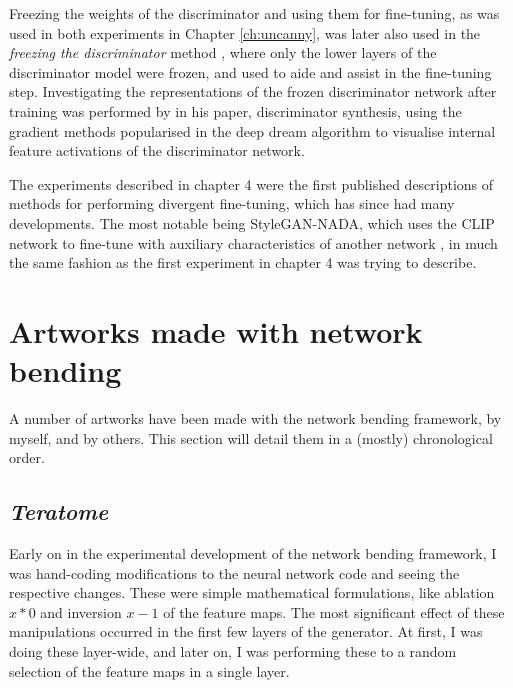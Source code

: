 Freezing the weights of the discriminator and using them for fine-tuning, as was used in both experiments in Chapter \ref{ch:uncanny}, was later also used in the \textit{freezing the discriminator} method \citep{mo2020freeze}, where only the lower layers of the discriminator model were frozen, and used to aide and assist in the fine-tuning step.
Investigating the representations of the frozen discriminator network after training was performed by \citet{porres2021discriminator} in his paper, discriminator synthesis, using the gradient methods popularised in the deep dream algorithm to visualise internal feature activations of the discriminator network.

The experiments described in chapter 4 were the first published descriptions of methods for performing divergent fine-tuning, which has since had many developments. 
The most notable being StyleGAN-NADA, which uses the CLIP network to fine-tune with auxiliary characteristics of another network \citep{gal2021stylegan}, in much the same fashion as the first experiment in chapter 4 was trying to describe. 

\section{Artworks made with network bending}

A number of artworks have been made with the network bending framework, by myself, and by others. 
This section will detail them in a (mostly) chronological order.

\subsection{\textit{Teratome}}

Early on in the experimental development of the network bending framework, I was hand-coding modifications to the neural network code and seeing the respective changes. 
These were simple mathematical formulations, like ablation $x*0$ and inversion $x-1$ of the feature maps. 
The most significant effect of these manipulations occurred in the first few layers of the generator. 
At first, I was doing these layer-wide, and later on, I was performing these to a random selection of the feature maps in a single layer. 

